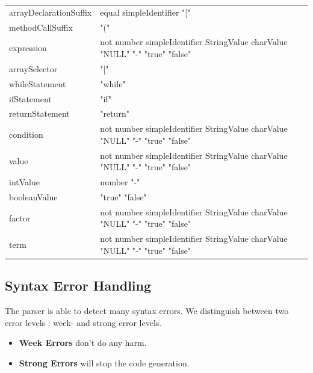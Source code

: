 \begin{tabularx}{\linewidth}{YY}
arrayDeclarationSuffix & equal simpleIdentifier "[" \\
methodCallSuffix & "(" \\
expression & not number simpleIdentifier StringValue charValue "NULL" "-" "true" "false" \\
arraySelector & "[" \\
whileStatement & "while" \\
ifStatement & "if" \\
returnStatement & "return" \\
condition & not number simpleIdentifier StringValue charValue "NULL" "-" "true" "false" \\
value & not number simpleIdentifier StringValue charValue "NULL" "-" "true" "false" \\
intValue & number "-" \\
booleanValue & "true" "false" \\
factor & not number simpleIdentifier StringValue charValue "NULL" "-" "true" "false" \\
term & not number simpleIdentifier StringValue charValue "NULL" "-" "true" "false" \\
\end{tabularx}
%

\newpage
\subsection{Syntax Error Handling}
The parser is able to detect many syntax errors. We distinguish between two error levels : week- and strong error levels.
\begin{itemize}
  \item \textbf{Week Errors} don't do any harm. 
  \item \textbf{Strong Errors} will stop the code generation. 
\end{itemize}

